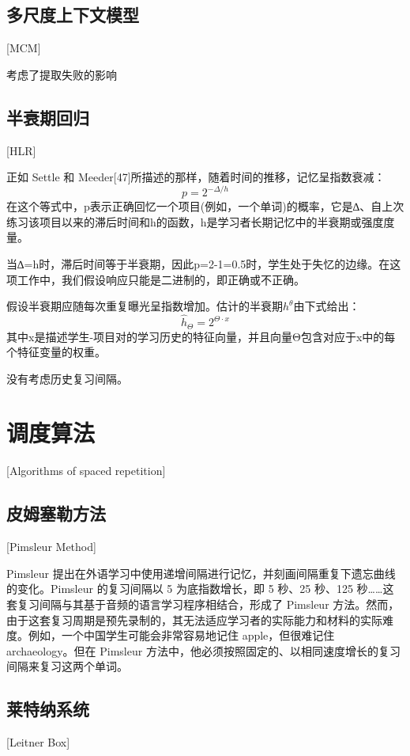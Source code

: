 \subsection{多尺度上下文模型}[MCM]

考虑了提取失败的影响

\subsection{半衰期回归}[HLR]

正如 Settle 和 Meeder[47]所描述的那样，随着时间的推移，记忆呈指数衰减：
\begin{equation}
p = 2^{-\Delta/h}
\end{equation}
在这个等式中，p表示正确回忆一个项目(例如，一个单词)的概率，它是∆、自上次练习该项目以来的滞后时间和h的函数，h是学习者长期记忆中的半衰期或强度度量。

当∆=h时，滞后时间等于半衰期，因此p=2-1=0.5时，学生处于失忆的边缘。在这项工作中，我们假设响应只能是二进制的，即正确或不正确。

假设半衰期应随每次重复曝光呈指数增加。估计的半衰期$h^\theta$由下式给出：
\begin{equation}
\hat{h}_{\Theta}=2^{\Theta\cdot x}
\end{equation}
其中x是描述学生-项目对的学习历史的特征向量，并且向量Θ包含对应于x中的每个特征变量的权重。

没有考虑历史复习间隔。

\section{调度算法}[Algorithms of spaced repetition]

\subsection{皮姆塞勒方法}[Pimsleur Method]

Pimsleur 提出在外语学习中使用递增间隔进行记忆，并刻画间隔重复下遗忘曲线的变化。Pimsleur 的复习间隔以 5 为底指数增长，即 5 秒、25 秒、125 秒……这套复习间隔与其基于音频的语言学习程序相结合，形成了 Pimsleur 方法。然而，由于这套复习周期是预先录制的，其无法适应学习者的实际能力和材料的实际难度。例如，一个中国学生可能会非常容易地记住 apple，但很难记住 archaeology。但在 Pimsleur 方法中，他必须按照固定的、以相同速度增长的复习间隔来复习这两个单词。

\subsection{莱特纳系统}[Leitner Box]

